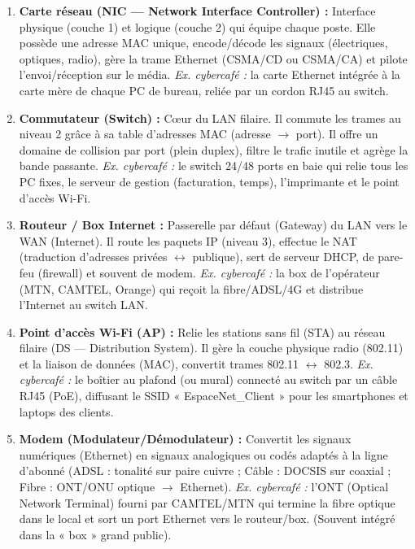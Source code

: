 \documentclass[11pt]{article}
\newcommand{\cle}[1]{{\popxbold\color{popdark}#1}}
\begin{document}
\begin{corrige}
\begin{enumerate}
  \item \textbf{Carte réseau (NIC — Network Interface Controller) :} Interface physique (couche 1) et logique (couche 2) qui équipe chaque poste. Elle possède une \cle{adresse MAC} unique, encode/décode les signaux (électriques, optiques, radio), gère la trame Ethernet (CSMA/CD ou CSMA/CA) et pilote l'envoi/réception sur le média. \textit{Ex. cybercafé :} la carte Ethernet intégrée à la carte mère de chaque PC de bureau, reliée par un cordon RJ45 au switch.
  \item \textbf{Commutateur (Switch) :} Cœur du LAN filaire. Il commute les trames au niveau 2 grâce à sa table d'adresses MAC (adresse $\rightarrow$ port). Il offre un domaine de collision par port (plein duplex), filtre le trafic inutile et agrège la bande passante. \textit{Ex. cybercafé :} le switch 24/48 ports en baie qui relie tous les PC fixes, le serveur de gestion (facturation, temps), l'imprimante et le point d'accès Wi-Fi.
  \item \textbf{Routeur / Box Internet :} Passerelle par défaut (Gateway) du LAN vers le WAN (Internet). Il route les paquets IP (niveau 3), effectue le \cle{NAT} (traduction d'adresses privées $\leftrightarrow$ publique), sert de serveur DHCP, de pare-feu (firewall) et souvent de modem. \textit{Ex. cybercafé :} la box de l'opérateur (MTN, CAMTEL, Orange) qui reçoit la fibre/ADSL/4G et distribue l'Internet au switch LAN.
  \item \textbf{Point d'accès Wi-Fi (AP) :} Relie les stations sans fil (STA) au réseau filaire (DS — Distribution System). Il gère la couche physique radio (802.11) et la liaison de données (MAC), convertit trames 802.11 $\leftrightarrow$ 802.3. \textit{Ex. cybercafé :} le boîtier au plafond (ou mural) connecté au switch par un câble RJ45 (PoE), diffusant le SSID « EspaceNet\_Client » pour les smartphones et laptops des clients.
  \item \textbf{Modem (Modulateur/Démodulateur) :} Convertit les signaux numériques (Ethernet) en signaux analogiques ou codés adaptés à la ligne d'abonné (ADSL : tonalité sur paire cuivre ; Câble : DOCSIS sur coaxial ; Fibre : ONT/ONU optique $\rightarrow$ Ethernet). \textit{Ex. cybercafé :} l'ONT (Optical Network Terminal) fourni par CAMTEL/MTN qui termine la fibre optique dans le local et sort un port Ethernet vers le routeur/box. (Souvent intégré dans la « box » grand public).
\end{enumerate}
\end{corrige}
\end{document}
